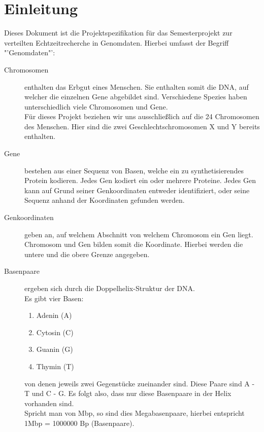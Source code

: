 \section{Einleitung}
Dieses Dokument ist die Projektspezifikation für das Semesterprojekt zur verteilten Echtzeitrecherche in Genomdaten. 
Hierbei umfasst der Begriff "'Genomdaten"':
\\
\begin{description}
\item[Chromosomen] enthalten das Erbgut eines Menschen. Sie enthalten somit die DNA, auf welcher die einzelnen Gene abgebildet sind. Verschiedene Spezies haben unterschiedlich viele Chromosomen und Gene. 
\\ Für dieses Projekt beziehen wir uns ausschließlich auf die 24 Chromosomen des Menschen. Hier sind die zwei Geschlechtschromosomen X und Y bereits enthalten.

\item[Gene] bestehen aus einer Sequenz von Basen, welche ein zu synthetisierendes Protein kodieren. Jedes Gen kodiert ein oder mehrere Proteine. Jedes Gen kann auf Grund seiner Genkoordinaten entweder identifiziert, oder seine Sequenz anhand der Koordinaten gefunden werden.

\item[Genkoordinaten] geben an, auf welchem Abschnitt von welchem Chromosom ein Gen liegt. Chromosom und Gen bilden somit die Koordinate.
Hierbei werden die untere und die obere Grenze angegeben.

\item[Basenpaare] ergeben sich durch die Doppelhelix-Struktur der DNA.\\ Es gibt vier Basen:
\begin{enumerate}
\item Adenin (A) 
\item Cytosin (C)
\item Guanin (G)
\item Thymin (T)
\end{enumerate}
 von denen jeweils zwei Gegenstücke zueinander sind. Diese Paare sind A - T und C - G. Es folgt also, dass nur diese Basenpaare in der Helix vorhanden sind.\\
Spricht man von Mbp, so sind dies Megabasenpaare, hierbei entspricht\\
1Mbp = 1000000 Bp (Basenpaare).


\end{description}
